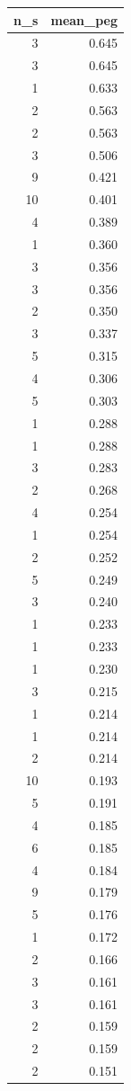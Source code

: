 \begin{tabular}{rr}
\toprule
n_s & mean_peg \\
\midrule
3 & 0.645 \\
3 & 0.645 \\
1 & 0.633 \\
2 & 0.563 \\
2 & 0.563 \\
3 & 0.506 \\
9 & 0.421 \\
10 & 0.401 \\
4 & 0.389 \\
1 & 0.360 \\
3 & 0.356 \\
3 & 0.356 \\
2 & 0.350 \\
3 & 0.337 \\
5 & 0.315 \\
4 & 0.306 \\
5 & 0.303 \\
1 & 0.288 \\
1 & 0.288 \\
3 & 0.283 \\
2 & 0.268 \\
4 & 0.254 \\
1 & 0.254 \\
2 & 0.252 \\
5 & 0.249 \\
3 & 0.240 \\
1 & 0.233 \\
1 & 0.233 \\
1 & 0.230 \\
3 & 0.215 \\
1 & 0.214 \\
1 & 0.214 \\
2 & 0.214 \\
10 & 0.193 \\
5 & 0.191 \\
4 & 0.185 \\
6 & 0.185 \\
4 & 0.184 \\
9 & 0.179 \\
5 & 0.176 \\
1 & 0.172 \\
2 & 0.166 \\
3 & 0.161 \\
3 & 0.161 \\
2 & 0.159 \\
2 & 0.159 \\
2 & 0.151 \\

\end{tabular}
